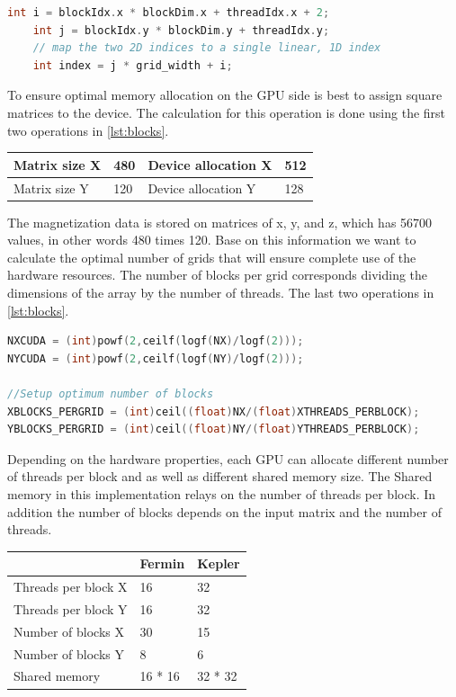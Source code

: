 \begin{lstlisting}[language=C++, label={lst:flatten}, caption={Kernel Flatten}]	
    int i = blockIdx.x * blockDim.x + threadIdx.x + 2;
    int j = blockIdx.y * blockDim.y + threadIdx.y;
    // map the two 2D indices to a single linear, 1D index
    int index = j * grid_width + i;
\end{lstlisting}



To ensure optimal memory allocation on the GPU side is best to assign square matrices to the device. The calculation for this operation is done using the first two operations in \ref{lst:blocks}.

\begin{table}[h]
\centering
\begin{tabular}{| l | l | l | l | }
\hline
Matrix size X & 480 & Device allocation X & 512\\
\hline
Matrix size Y & 120 & Device allocation Y & 128 \\
\hline
\end{tabular}
\end{table}

The magnetization data is stored on matrices of x, y, and z, which has 56700 values, in other words 480 times 120. Base on this information we want to calculate the optimal number of grids that will ensure complete use of the hardware resources. The number of blocks per grid corresponds dividing  the dimensions of the array by the number of threads. The last two operations in \ref{lst:blocks}.

\begin{lstlisting}[language=C++, label={lst:blocks}, caption={Device capacity calculation and number of block per grid}]	
NXCUDA = (int)powf(2,ceilf(logf(NX)/logf(2)));
NYCUDA = (int)powf(2,ceilf(logf(NY)/logf(2)));

//Setup optimum number of blocks
XBLOCKS_PERGRID = (int)ceil((float)NX/(float)XTHREADS_PERBLOCK); 
YBLOCKS_PERGRID = (int)ceil((float)NY/(float)YTHREADS_PERBLOCK);
\end{lstlisting}

Depending on the hardware properties, each GPU can allocate different number of threads per block and as well as different shared memory size. The Shared memory in this implementation relays on the number of threads per block. In addition the number of blocks depends on the input matrix and the number of threads.

\begin{table}[h]
\centering
\begin{tabular}{| l | l | l |}
\hline
 & Fermin & Kepler \\
\hline
Threads per block X  & 16 & 32 \\
\hline
Threads per block Y  & 16 & 32 \\
\hline
Number of blocks X & 30 & 15 \\
\hline
Number of blocks Y & 8 & 6 \\
\hline
Shared memory & 16 * 16 & 32 * 32 \\
\hline
\end{tabular}
\end{table}

